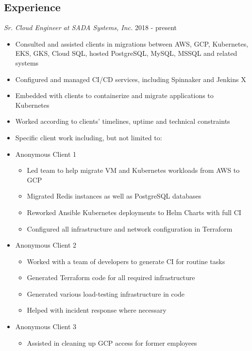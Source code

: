 \documentclass[line]{docs/resume/res}
\begin{document}
\begin{resume}
\section{Experience}
  {\sl Sr. Cloud Engineer at SADA Systems, Inc.} \hfill 2018 - present
  \begin{itemize} \itemsep -2pt
    \item Consulted and assisted clients in migrations between AWS, GCP, Kubernetes, \\
      EKS, GKS, Cloud SQL, hosted PostgreSQL, MySQL, MSSQL and related systems
    \item Configured and managed CI/CD services, including Spinnaker and Jenkins X
    \item Embedded with clients to containerize and migrate applications to Kubernetes
    \item Worked according to clients' timelines, uptime and technical constraints
    \item Specific client work including, but not limited to:
    \item Anonymous Client 1
    \begin{itemize} \itemsep -2pt
      \item Led team to help migrate VM and Kubernetes workloads from AWS to GCP
      \item Migrated Redis instances as well as PostgreSQL databases
      \item Reworked Ansible Kubernetes deployments to Helm Charts with full CI
      \item Configured all infrastructure and network configuration in Terraform
    \end{itemize}
    \item Anonymous Client 2
    \begin{itemize} \itemsep -2pt
      \item Worked with a team of developers to generate CI for routine tasks
      \item Generated Terraform code for all required infrastructure
      \item Generated various load-testing infrastructure in code
      \item Helped with incident response where necessary
    \end{itemize}
    \item Anonymous Client 3
    \begin{itemize} \itemsep -2pt
      \item Assisted in cleaning up GCP access for former employees

\end{itemize}
\end{itemize}
\end{resume}
\end{document}
